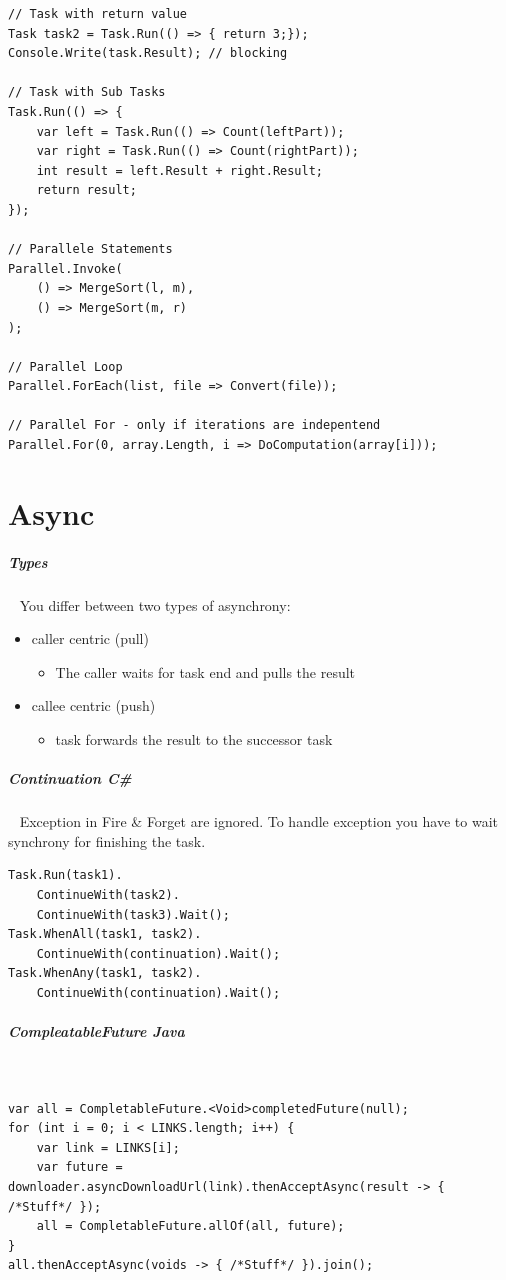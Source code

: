 \documentclass[8pt,twoside,landscape]{extarticle}
\begin{document}
\begin{multicols}{5}
\begin{lstlisting}
// Task with return value
Task task2 = Task.Run(() => { return 3;});
Console.Write(task.Result); // blocking

// Task with Sub Tasks
Task.Run(() => {
    var left = Task.Run(() => Count(leftPart));
    var right = Task.Run(() => Count(rightPart));
    int result = left.Result + right.Result;
    return result;
});

// Parallele Statements
Parallel.Invoke(
    () => MergeSort(l, m),
    () => MergeSort(m, r)
);

// Parallel Loop
Parallel.ForEach(list, file => Convert(file));

// Parallel For - only if iterations are indepentend
Parallel.For(0, array.Length, i => DoComputation(array[i]));
\end{lstlisting}
\section{Async}
\label{sec:orgbcade66}
\subparagraph{Types} \
\label{sec:org838d9ea}
You differ between two types of asynchrony:
\begin{itemize}
\item caller centric (pull)
\begin{itemize}
\item The caller waits for task end and pulls the result
\end{itemize}
\item callee centric (push)
\begin{itemize}
\item task forwards the result to the successor task
\end{itemize}
\end{itemize}
\subparagraph{Continuation C\#} \
\label{sec:org715eddd}
Exception in Fire \& Forget are ignored.
To handle exception you have to wait synchrony for finishing the task.

\lstset{language=csharp,label= ,caption= ,captionpos=b,numbers=none}
\begin{lstlisting}
Task.Run(task1).
    ContinueWith(task2).
    ContinueWith(task3).Wait();
Task.WhenAll(task1, task2).
    ContinueWith(continuation).Wait();
Task.WhenAny(task1, task2).
    ContinueWith(continuation).Wait();
\end{lstlisting}
\subparagraph{CompleatableFuture Java} \
\label{sec:orgc31794f}
\lstset{language=java,label= ,caption= ,captionpos=b,numbers=none}
\begin{lstlisting}
var all = CompletableFuture.<Void>completedFuture(null);
for (int i = 0; i < LINKS.length; i++) {
    var link = LINKS[i];
    var future = downloader.asyncDownloadUrl(link).thenAcceptAsync(result -> { /*Stuff*/ });
    all = CompletableFuture.allOf(all, future);
}
all.thenAcceptAsync(voids -> { /*Stuff*/ }).join();
\end{lstlisting}

\end{multicols}
\end{document}
